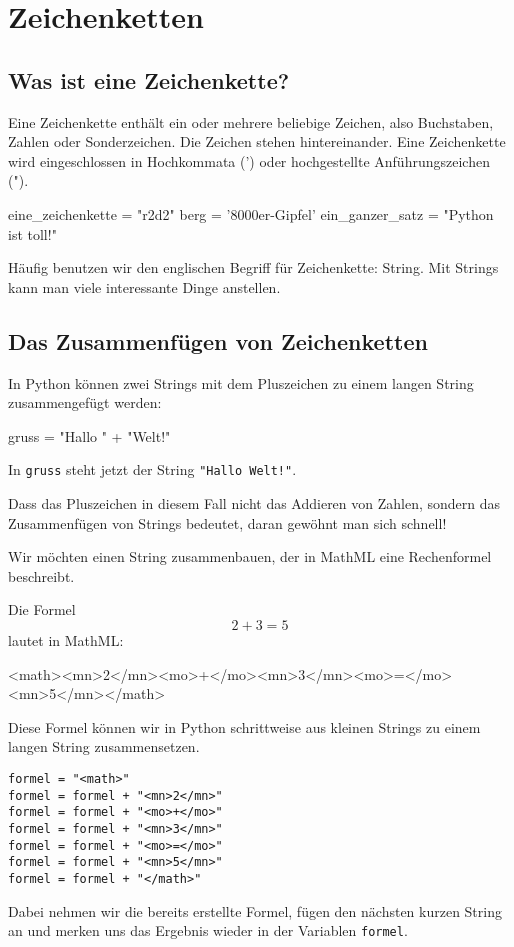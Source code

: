\section{Zeichenketten}

\subsection*{Was ist eine Zeichenkette?}

Eine Zeichenkette enthält ein oder mehrere beliebige Zeichen, also Buchstaben, Zahlen oder Sonderzeichen. Die Zeichen stehen hintereinander. Eine Zeichenkette wird eingeschlossen in Hochkommata (') oder hochgestellte Anführungszeichen (").

\begin{codePython}
eine_zeichenkette = "r2d2"
berg = '8000er-Gipfel'
ein_ganzer_satz = "Python ist toll!"
\end{codePython}

Häufig benutzen wir den englischen Begriff für Zeichenkette: String. Mit Strings kann man viele interessante Dinge anstellen.

\subsection*{Das Zusammenfügen von Zeichenketten}

In Python können zwei Strings mit dem Pluszeichen zu einem langen String zusammengefügt werden:

\begin{codePython}
gruss = "Hallo " + "Welt!"
\end{codePython}

In \texttt{gruss} steht jetzt der String \texttt{"Hallo Welt!"}.

Dass das Pluszeichen in diesem Fall nicht das Addieren von Zahlen, sondern das Zusammenfügen von Strings bedeutet, daran gewöhnt man sich schnell!

Wir möchten einen String zusammenbauen, der in MathML eine Rechenformel beschreibt.

Die Formel
\[
2 + 3 = 5
\]
lautet in MathML:

\begin{codeHTML}
<math><mn>2</mn><mo>+</mo><mn>3</mn><mo>=</mo><mn>5</mn></math>
\end{codeHTML}

Diese Formel können wir in Python schrittweise aus kleinen Strings zu einem langen String zusammensetzen. 

\lstset{style=syntaxPython}
\begin{lstlisting}
formel = "<math>"
formel = formel + "<mn>2</mn>"
formel = formel + "<mo>+</mo>"
formel = formel + "<mn>3</mn>"
formel = formel + "<mo>=</mo>"
formel = formel + "<mn>5</mn>"
formel = formel + "</math>"
\end{lstlisting}

Dabei nehmen wir die bereits erstellte Formel, fügen den nächsten kurzen String an und merken uns das Ergebnis wieder in der Variablen \texttt{formel}.